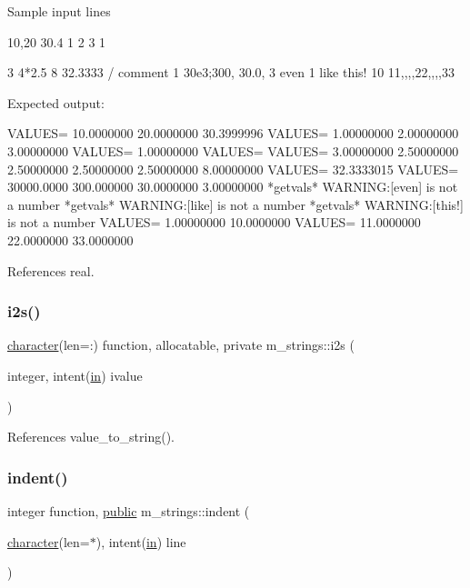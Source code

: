 Sample input lines \begin{DoxyVerb} 10,20 30.4
 1 2 3
 1

 3 4*2.5 8
 32.3333 / comment 1
 30e3;300,    30.0, 3
 even 1 like this! 10
 11,,,,22,,,,33
\end{DoxyVerb}


Expected output\+: \begin{DoxyVerb}VALUES=   10.0000000       20.0000000       30.3999996
VALUES=   1.00000000       2.00000000       3.00000000
VALUES=   1.00000000
VALUES=
VALUES=   3.00000000       2.50000000       2.50000000       2.50000000       2.50000000       8.00000000
VALUES=   32.3333015
VALUES=   30000.0000       300.000000       30.0000000       3.00000000
*getvals* WARNING:[even] is not a number
*getvals* WARNING:[like] is not a number
*getvals* WARNING:[this!] is not a number
VALUES=   1.00000000       10.0000000
VALUES=   11.0000000       22.0000000       33.0000000 \end{DoxyVerb}
 

References real.

\mbox{\label{namespacem__strings_a83cecfcd4582760bf2b1e12364c29443}} 
\subsubsection{\texorpdfstring{i2s()}{i2s()}}
{\footnotesize\ttfamily \hyperlink{option__stopwatch_83_8txt_abd4b21fbbd175834027b5224bfe97e66}{character}(len=\+:) function, allocatable, private m\+\_\+strings\+::i2s (\begin{DoxyParamCaption}\item[{integer, intent(\hyperlink{M__journal_83_8txt_afce72651d1eed785a2132bee863b2f38}{in})}]{ivalue }\end{DoxyParamCaption})\hspace{0.3cm}{\ttfamily [private]}}



References value\+\_\+to\+\_\+string().

\mbox{\label{namespacem__strings_a020dcca7f01d33eedf28b17518a22b69}} 
\subsubsection{\texorpdfstring{indent()}{indent()}}
{\footnotesize\ttfamily integer function, \hyperlink{M__stopwatch_83_8txt_a2f74811300c361e53b430611a7d1769f}{public} m\+\_\+strings\+::indent (\begin{DoxyParamCaption}\item[{\hyperlink{option__stopwatch_83_8txt_abd4b21fbbd175834027b5224bfe97e66}{character}(len=$\ast$), intent(\hyperlink{M__journal_83_8txt_afce72651d1eed785a2132bee863b2f38}{in})}]{line }\end{DoxyParamCaption})}



